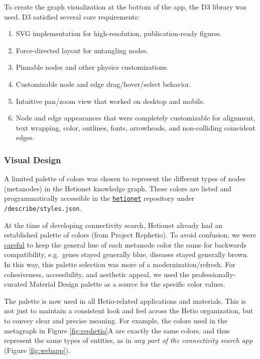 To create the graph visualization at the bottom of the app, the D3 library was used.
D3 satisfied several core requirements:

\begin{enumerate}
\def\labelenumi{\arabic{enumi}.}
\tightlist
\item
  SVG implementation for high-resolution, publication-ready figures.
\item
  Force-directed layout for untangling nodes.
\item
  Pinnable nodes and other physics customizations.
\item
  Customizable node and edge drag/hover/select behavior.
\item
  Intuitive pan/zoom view that worked on desktop and mobile.
\item
  Node and edge appearances that were completely customizable for alignment, text wrapping, color, outlines, fonts, arrowheads, and non-colliding coincident edges.
\end{enumerate}

\hypertarget{visual-design}{%
\subsubsection{Visual Design}\label{visual-design}}

A limited palette of colors was chosen to represent the different types of nodes (metanodes) in the Hetionet knowledge graph.
These colors are listed and programmatically accessible in the \href{https://github.com/hetio/hetionet}{\texttt{hetionet}} repository under \texttt{/describe/styles.json}.

At the time of developing connectivity search, Hetionet already had an established palette of colors (from Project Rephetio).
To avoid confusion, we were \href{https://github.com/hetio/hetionet/pull/18}{careful} to keep the general hue of each metanode color the same for backwards compatibility,
e.g.~genes stayed generally blue, diseases stayed generally brown.
In this way, this palette selection was more of a modernization/refresh.
For cohesiveness, accessibility, and aesthetic appeal,
we used the professionally-curated Material Design palette as a source for the specific color values.

The palette is now used in all Hetio-related applications and materials.
This is not just to maintain a consistent look and feel across the Hetio organization, but to convey clear and precise meaning.
For example, the colors used in the metagraph in Figure \ref{fig:rephetio}A are exactly the same colors, and thus represent the same types of entities, as in \emph{any part of the connectivity search app} (Figure \ref{fig:webapp}).

